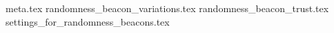 {meta.tex}
{randomness_beacon_variations.tex}
{randomness_beacon_trust.tex}
{settings_for_randomness_beacons.tex}
